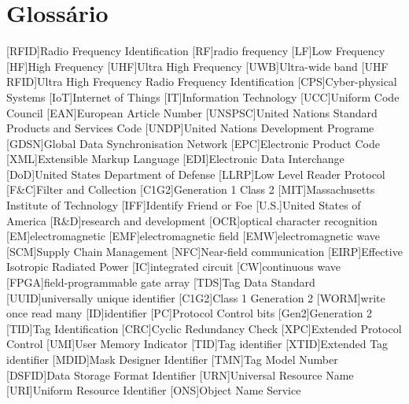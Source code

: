 \chapter{Glossário}

\footnotesize
\SingleSpacing

\begin{multicols}{2}
\begin{acronym}[AAAAAA]

	[RFID]{Radio Frequency Identification}
	[RF]{radio frequency}
	[LF]{Low Frequency}
	[HF]{High Frequency}
	[UHF]{Ultra High Frequency}
	[UWB]{Ultra-wide band}
	[UHF RFID]{Ultra High Frequency Radio Frequency Identification}
	[CPS]{Cyber-physical Systems}
	[IoT]{Internet of Things}
	[IT]{Information Technology}
	[UCC]{Uniform Code Council}
	[EAN]{European Article Number}
	[UNSPSC]{United Nations Standard Products and Services Code}
	[UNDP]{United Nations Development Programe}
	[GDSN]{Global Data Synchronisation Network}
	[EPC]{Electronic Product Code}
	[XML]{Extensible Markup Language}
	[EDI]{Electronic Data Interchange}
	[DoD]{United States Department of Defense}
	[LLRP]{Low Level Reader Protocol}
	[F\&C]{Filter and Collection}
	[C1G2]{Generation 1 Class 2}
	[MIT]{Massachusetts Institute of Technology}
	[IFF]{Identify Friend or Foe}
	[U.S.]{United States of America}
	[R\&D]{research and development}
	[OCR]{optical character recognition}
	[EM]{electromagnetic}
	[EMF]{electromagnetic field}
	[EMW]{electromagnetic wave}
	[SCM]{Supply Chain Management}
	[NFC]{Near-field communication}
	[EIRP]{Effective Isotropic Radiated Power}
	[IC]{integrated circuit}
	[CW]{continuous wave}
	[FPGA]{field-programmable gate array}
	[TDS]{Tag Data Standard}
	[UUID]{universally unique identifier}
	[C1G2]{Class 1 Generation 2}
	[WORM]{write once read many}
	[ID]{identifier}
	[PC]{Protocol Control bits}
	[Gen2]{Generation 2}
	[TID]{Tag Identification}
	[CRC]{Cyclic Redundancy Check}
	[XPC]{Extended Protocol Control}
	[UMI]{User Memory Indicator}
	[TID]{Tag identifier}
	[XTID]{Extended Tag identifier}
	[MDID]{Mask Designer Identifier}
	[TMN]{Tag Model Number}
	[DSFID]{Data Storage Format Identifier}
	[URN]{Universal Resource Name}
	[URI]{Uniform Resource Identifier}
	[ONS]{Object Name Service}
\end{acronym}
\end{multicols}

